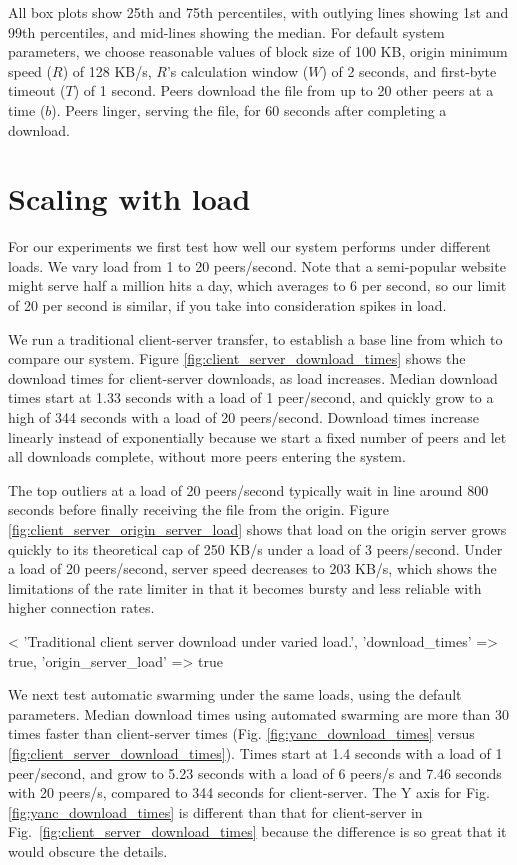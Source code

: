All box plots show 25th and 75th percentiles, with outlying lines showing 1st and 99th percentiles, and mid-lines showing the median.
For default system parameters, we choose reasonable values of block size of 100 KB, origin minimum speed ($R$) of 128 KB/s, $R$'s calculation window ($W$) 
of 2 seconds, and first-byte timeout ($T$) of 1 second.  Peers download the file from up to 20 other peers at a time ($b$).
Peers linger, serving the file, for 60 seconds after completing a download.

\section{Scaling with load}

For our experiments we first test how well our system performs under different loads.  We vary load from 1 to 20 peers/second.  
Note that a semi-popular website might serve half a million hits a day,
which averages to 6 per second, so our limit of 20 per second is similar, if you take into consideration spikes in load.

We run a traditional client-server transfer, to establish a base line from which to compare 
our system. Figure \ref{fig:client_server_download_times} shows the download times for client-server 
downloads, as load increases.  Median download times start at 1.33 seconds with a load of 1 peer/second,
and quickly grow to a high of 344 seconds with a load of 20 peers/second. 
Download times increase linearly instead of exponentially because we start a fixed number of peers and let all downloads complete, without more peers
entering the system.

The top outliers at a load of 20 peers/second typically wait in line around 800 seconds before 
finally receiving the file from the origin. Figure \ref{fig:client_server_origin_server_load} shows that load on the origin server grows quickly to its 
theoretical cap of 250 KB/s under a load of 3 peers/second. Under a load of 20 peers/second, server speed decreases to 203 KB/s, which 
shows the limitations of the rate limiter in that it becomes bursty and less reliable with higher connection rates.

<%
  'Traditional client server download under varied load.', {'download_times' => true, 'origin_server_load' => true} %

We next test automatic swarming under the same loads, using the default parameters. 
Median download times using automated swarming are more than 30 times faster than client-server times (Fig. \ref{fig:yanc_download_times} versus \ref{fig:client_server_download_times}).
Times start at 1.4 seconds with a load of 1 peer/second, and grow 
to 5.23 seconds with a load of 6 peers/s and 7.46 seconds with 20 peers/s, compared to 344 seconds for client-server.
The Y axis for Fig. \ref{fig:yanc_download_times} is different than that for client-server in 
Fig.~\ref{fig:client_server_download_times} because the difference is so great that it would obscure the details. 

